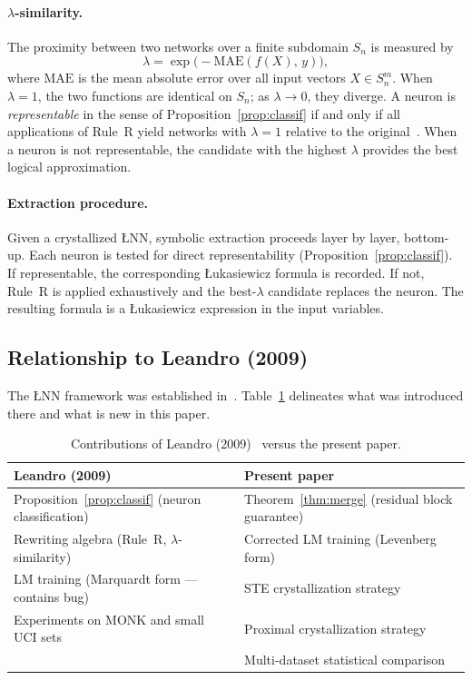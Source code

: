 \documentclass[10pt,a4paper,twoside]{article}
\newcommand{\LNN}{\L{}NN}
\begin{document}
\paragraph{$\lambda$-similarity.}
The proximity between two networks over a finite subdomain $S_n$ is measured by
\begin{equation}
  \lambda = \exp\bigl(-\mathrm{MAE}(f(X),\, y)\bigr),
  \label{eq:lambda}
\end{equation}
where $\mathrm{MAE}$ is the mean absolute error over all input vectors $X \in S_n^m$.
When $\lambda = 1$, the two functions are identical on $S_n$; as $\lambda \to 0$,
they diverge.
A neuron is \emph{representable} in the sense of Proposition~\ref{prop:classif}
if and only if all applications of Rule~R yield networks with $\lambda = 1$
relative to the original~\cite{leandro2009}.
When a neuron is not representable, the candidate with the highest $\lambda$
provides the best logical approximation.

\paragraph{Extraction procedure.}
Given a crystallized \LNN{}, symbolic extraction proceeds layer by layer,
bottom-up.
Each neuron is tested for direct representability (Proposition~\ref{prop:classif}).
If representable, the corresponding \L{}ukasiewicz formula is recorded.
If not, Rule~R is applied exhaustively and the best-$\lambda$ candidate
replaces the neuron.
The resulting formula is a \L{}ukasiewicz expression in the input variables.

\subsection{Relationship to Leandro (2009)}
\label{ssec:prior}

The \LNN{} framework was established in~\cite{leandro2009}.
Table~\ref{tab:contributions} delineates what was introduced there and what
is new in this paper.

\begin{table}[h]
\centering
\caption{Contributions of Leandro (2009)~\cite{leandro2009} versus the
present paper.}
\label{tab:contributions}
\setlength{\tabcolsep}{4pt}
\begin{tabular}{ll}
\toprule
Leandro (2009) & Present paper \\
\midrule
Proposition~\ref{prop:classif} (neuron classification) &
  Theorem~\ref{thm:merge} (residual block guarantee) \\
Rewriting algebra (Rule~R, $\lambda$-similarity) &
  Corrected LM training (Levenberg form) \\
LM training (Marquardt form --- contains bug) &
  STE crystallization strategy \\
Experiments on MONK and small UCI sets &
  Proximal crystallization strategy \\
 & Multi-dataset statistical comparison \\
\bottomrule
\end{tabular}
\end{table}
\end{document}
